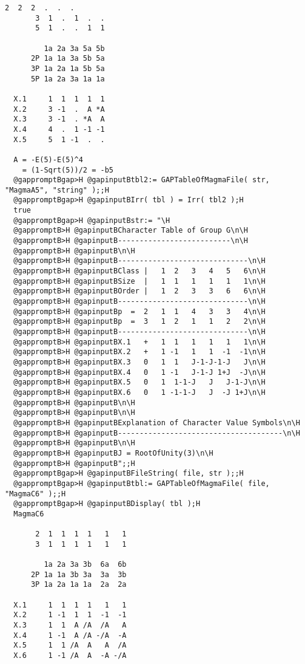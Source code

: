 \documentclass[a4paper,11pt]{report}
\begin{document}
{{{\begin{Verbatim}[commandchars=@BH,fontsize=\small,frame=single,label=Example]
       2  2  2  .  .  .
       3  1  .  1  .  .
       5  1  .  .  1  1
  
         1a 2a 3a 5a 5b
      2P 1a 1a 3a 5b 5a
      3P 1a 2a 1a 5b 5a
      5P 1a 2a 3a 1a 1a
  
  X.1     1  1  1  1  1
  X.2     3 -1  .  A *A
  X.3     3 -1  . *A  A
  X.4     4  .  1 -1 -1
  X.5     5  1 -1  .  .
  
  A = -E(5)-E(5)^4
    = (1-Sqrt(5))/2 = -b5
  @gappromptBgap>H @gapinputBtbl2:= GAPTableOfMagmaFile( str, "MagmaA5", "string" );;H
  @gappromptBgap>H @gapinputBIrr( tbl ) = Irr( tbl2 );H
  true
  @gappromptBgap>H @gapinputBstr:= "\H
  @gappromptB>H @gapinputBCharacter Table of Group G\n\H
  @gappromptB>H @gapinputB--------------------------\n\H
  @gappromptB>H @gapinputB\n\H
  @gappromptB>H @gapinputB------------------------------\n\H
  @gappromptB>H @gapinputBClass |   1  2   3   4   5   6\n\H
  @gappromptB>H @gapinputBSize  |   1  1   1   1   1   1\n\H
  @gappromptB>H @gapinputBOrder |   1  2   3   3   6   6\n\H
  @gappromptB>H @gapinputB------------------------------\n\H
  @gappromptB>H @gapinputBp  =  2   1  1   4   3   3   4\n\H
  @gappromptB>H @gapinputBp  =  3   1  2   1   1   2   2\n\H
  @gappromptB>H @gapinputB------------------------------\n\H
  @gappromptB>H @gapinputBX.1   +   1  1   1   1   1   1\n\H
  @gappromptB>H @gapinputBX.2   +   1 -1   1   1  -1  -1\n\H
  @gappromptB>H @gapinputBX.3   0   1  1   J-1-J-1-J   J\n\H
  @gappromptB>H @gapinputBX.4   0   1 -1   J-1-J 1+J  -J\n\H
  @gappromptB>H @gapinputBX.5   0   1  1-1-J   J   J-1-J\n\H
  @gappromptB>H @gapinputBX.6   0   1 -1-1-J   J  -J 1+J\n\H
  @gappromptB>H @gapinputB\n\H
  @gappromptB>H @gapinputB\n\H
  @gappromptB>H @gapinputBExplanation of Character Value Symbols\n\H
  @gappromptB>H @gapinputB--------------------------------------\n\H
  @gappromptB>H @gapinputB\n\H
  @gappromptB>H @gapinputBJ = RootOfUnity(3)\n\H
  @gappromptB>H @gapinputB";;H
  @gappromptBgap>H @gapinputBFileString( file, str );;H
  @gappromptBgap>H @gapinputBtbl:= GAPTableOfMagmaFile( file, "MagmaC6" );;H
  @gappromptBgap>H @gapinputBDisplay( tbl );H
  MagmaC6
  
       2  1  1  1  1   1   1
       3  1  1  1  1   1   1
  
         1a 2a 3a 3b  6a  6b
      2P 1a 1a 3b 3a  3a  3b
      3P 1a 2a 1a 1a  2a  2a
  
  X.1     1  1  1  1   1   1
  X.2     1 -1  1  1  -1  -1
  X.3     1  1  A /A  /A   A
  X.4     1 -1  A /A -/A  -A
  X.5     1  1 /A  A   A  /A
  X.6     1 -1 /A  A  -A -/A
  

\end{Verbatim}}}}
\end{document}
